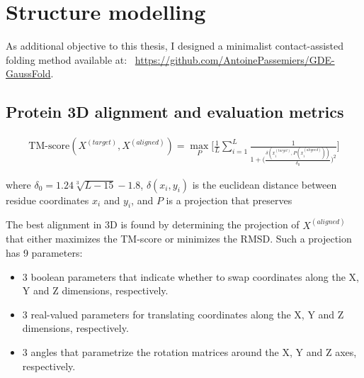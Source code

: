 \chapter{Structure modelling} \label{metrics3d}

  As additional objective to this thesis, I designed a minimalist contact-assisted folding method
  available at: \,
  \href{https://github.com/AntoinePassemiers/GDE-GaussFold}{https://github.com/AntoinePassemiers/GDE-GaussFold}.

  \section{Protein 3D alignment and evaluation metrics}

    \begin{align}
        \text{TM-score}(X^{(target)}, X^{(aligned)}) = \max_P \Bigg[ \frac{1}{L} \sum\limits_{i=1}^L
            \frac{1}{1 + \Big(\frac{\delta(x_i^{(target)}, P(x_i^{(aligned)}))}{\delta_0}\Big)^2} \Bigg]
    \end{align}

    where $\delta_0 = 1.24 \sqrt[3]{L - 15} - 1.8$, $\delta(x_i, y_i)$ is the euclidean distance
    between residue coordinates $x_i$ and $y_i$, and $P$ is a projection that preserves

    The best alignment in 3D is found by determining the projection of $X^{(aligned)}$ that
    either maximizes the TM-score or minimizes the RMSD.
    Such a projection has 9 parameters:
    \begin{itemize}
        \item 3 boolean parameters that indicate whether to swap coordinates along
        the X, Y and Z dimensions, respectively.
        \item 3 real-valued parameters for translating coordinates along the X, Y and Z
        dimensions, respectively.
        \item 3 angles that parametrize the rotation matrices around the X, Y and Z axes,
        respectively.
    \end{itemize}

